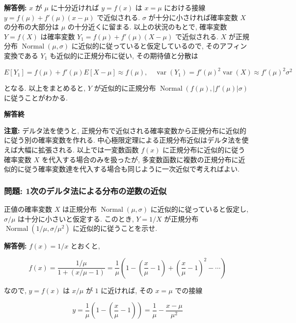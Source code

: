 \documentclass[
  letterpaper,
  DIV=11,
  numbers=noendperiod]{scrartcl}
\begin{document}
\textbf{解答例:} \(x\) が \(\mu\) に十分近ければ \(y = f(x)\) は
\(x=\mu\) における接線 \(y = f(\mu) + f'(\mu)(x - \mu)\) で近似される.
\(\sigma\) が十分に小さければ確率変数 \(X\) の分布の大部分は \(\mu\)
の十分近くに留まる. 以上の状況のもとで, 確率変数 \(Y = f(X)\) は確率変数
\(Y_1 = f(\mu) + f'(\mu)(X - \mu)\) で近似される. \(X\) が正規分布
\(\operatorname{Normal}(\mu,\sigma)\)
に近似的に従っていると仮定しているので, そのアフィン変換である \(Y_1\)
も近似的に正規分布に従い, その期待値と分散は

\[
E[Y_1] = f(\mu) + f'(\mu)E[X-\mu] \approx f(\mu), \quad
\operatorname{var}(Y_1) = f'(\mu)^2\operatorname{var}(X) \approx f'(\mu)^2\sigma^2
\]

となる. 以上をまとめると, \(Y\) が近似的に正規分布
\(\operatorname{Normal}(f(\mu), |f'(\mu)|\sigma)\) に従うことがわかる.

\textbf{解答終}

\textbf{注意:} デルタ法を使うと,
正規分布で近似される確率変数から正規分布に近似的に従う別の確率変数を作れる.
中心極限定理による正規分布近似はデルタ法を使えば大幅に拡張される.
以上では一変数函数 \(f(x)\) に正規分布に近似的に従う確率変数 \(X\)
を代入する場合のみを扱ったが,
多変数函数に複数の正規分布に近似的に従う確率変数達を代入する場合も同じように一次近似で考えればよい.

\hypertarget{ux554fux984c-1ux6b21ux306eux30c7ux30ebux30bfux6cd5ux306bux3088ux308bux5206ux5e03ux306eux9006ux6570ux306eux8fd1ux4f3c}{%
\subsubsection{問題:
1次のデルタ法による分布の逆数の近似}\label{ux554fux984c-1ux6b21ux306eux30c7ux30ebux30bfux6cd5ux306bux3088ux308bux5206ux5e03ux306eux9006ux6570ux306eux8fd1ux4f3c}}

正値の確率変数 \(X\) は正規分布 \(\operatorname{Normal}(\mu, \sigma)\)
に近似的に従っていると仮定し, \(\sigma/\mu\) は十分に小さいと仮定する.
このとき, \(Y = 1/X\) が正規分布
\(\operatorname{Normal}(1/\mu, \sigma/\mu^2)\) に近似的に従うことを示せ.

\textbf{解答例:} \(f(x)=1/x\) とおくと,

\[
f(x) = \frac{1/\mu}{1 + (x/\mu - 1)} =
\frac{1}{\mu}\left(1 - \left(\frac{x}{\mu}-1\right) + \left(\frac{x}{\mu}-1\right)^2 - \cdots\right)
\]

なので, \(y = f(x)\) は \(x/\mu\) が \(1\) に近ければ, その \(x=\mu\)
での接線

\[
y =
\frac{1}{\mu}\left(1 - \left(\frac{x}{\mu}-1\right)\right) =
\frac{1}{\mu} - \frac{x - \mu}{\mu^2}
\]
\end{document}
